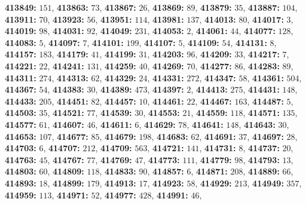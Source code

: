 \textsf{\bfseries 413849:} $151$, \textsf{\bfseries 413863:} $73$, \textsf{\bfseries 413867:} $26$, \textsf{\bfseries 413869:} $89$, \textsf{\bfseries 413879:} $35$, \textsf{\bfseries 413887:} $104$, \textsf{\bfseries 413911:} $70$, \textsf{\bfseries 413923:} $56$, \textsf{\bfseries 413951:} $114$, \textsf{\bfseries 413981:} $137$, \textsf{\bfseries 414013:} $80$, \textsf{\bfseries 414017:} $3$, \textsf{\bfseries 414019:} $98$, \textsf{\bfseries 414031:} $92$, \textsf{\bfseries 414049:} $231$, \textsf{\bfseries 414053:} $2$, \textsf{\bfseries 414061:} $44$, \textsf{\bfseries 414077:} $128$, \textsf{\bfseries 414083:} $5$, \textsf{\bfseries 414097:} $7$, \textsf{\bfseries 414101:} $199$, \textsf{\bfseries 414107:} $5$, \textsf{\bfseries 414109:} $54$, \textsf{\bfseries 414131:} $8$, \textsf{\bfseries 414157:} $183$, \textsf{\bfseries 414179:} $41$, \textsf{\bfseries 414199:} $31$, \textsf{\bfseries 414203:} $96$, \textsf{\bfseries 414209:} $33$, \textsf{\bfseries 414217:} $7$, \textsf{\bfseries 414221:} $22$, \textsf{\bfseries 414241:} $131$, \textsf{\bfseries 414259:} $40$, \textsf{\bfseries 414269:} $70$, \textsf{\bfseries 414277:} $86$, \textsf{\bfseries 414283:} $89$, \textsf{\bfseries 414311:} $274$, \textsf{\bfseries 414313:} $62$, \textsf{\bfseries 414329:} $24$, \textsf{\bfseries 414331:} $272$, \textsf{\bfseries 414347:} $58$, \textsf{\bfseries 414361:} $504$, \textsf{\bfseries 414367:} $54$, \textsf{\bfseries 414383:} $30$, \textsf{\bfseries 414389:} $473$, \textsf{\bfseries 414397:} $2$, \textsf{\bfseries 414413:} $275$, \textsf{\bfseries 414431:} $148$, \textsf{\bfseries 414433:} $205$, \textsf{\bfseries 414451:} $82$, \textsf{\bfseries 414457:} $10$, \textsf{\bfseries 414461:} $22$, \textsf{\bfseries 414467:} $163$, \textsf{\bfseries 414487:} $5$, \textsf{\bfseries 414503:} $35$, \textsf{\bfseries 414521:} $77$, \textsf{\bfseries 414539:} $30$, \textsf{\bfseries 414553:} $21$, \textsf{\bfseries 414559:} $118$, \textsf{\bfseries 414571:} $135$, \textsf{\bfseries 414577:} $61$, \textsf{\bfseries 414607:} $46$, \textsf{\bfseries 414611:} $6$, \textsf{\bfseries 414629:} $78$, \textsf{\bfseries 414641:} $148$, \textsf{\bfseries 414643:} $30$, \textsf{\bfseries 414653:} $107$, \textsf{\bfseries 414677:} $85$, \textsf{\bfseries 414679:} $198$, \textsf{\bfseries 414683:} $62$, \textsf{\bfseries 414691:} $37$, \textsf{\bfseries 414697:} $28$, \textsf{\bfseries 414703:} $6$, \textsf{\bfseries 414707:} $212$, \textsf{\bfseries 414709:} $563$, \textsf{\bfseries 414721:} $141$, \textsf{\bfseries 414731:} $8$, \textsf{\bfseries 414737:} $20$, \textsf{\bfseries 414763:} $45$, \textsf{\bfseries 414767:} $77$, \textsf{\bfseries 414769:} $47$, \textsf{\bfseries 414773:} $111$, \textsf{\bfseries 414779:} $98$, \textsf{\bfseries 414793:} $13$, \textsf{\bfseries 414803:} $60$, \textsf{\bfseries 414809:} $118$, \textsf{\bfseries 414833:} $90$, \textsf{\bfseries 414857:} $6$, \textsf{\bfseries 414871:} $208$, \textsf{\bfseries 414889:} $66$, \textsf{\bfseries 414893:} $18$, \textsf{\bfseries 414899:} $179$, \textsf{\bfseries 414913:} $17$, \textsf{\bfseries 414923:} $58$, \textsf{\bfseries 414929:} $213$, \textsf{\bfseries 414949:} $357$, \textsf{\bfseries 414959:} $113$, \textsf{\bfseries 414971:} $52$, \textsf{\bfseries 414977:} $428$, \textsf{\bfseries 414991:} $46$, 

